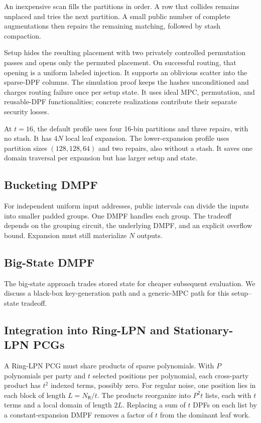 An inexpensive scan fills the partitions in order.
A row that collides remains unplaced and tries the next partition.
A small public number of complete augmentations then repairs the remaining
matching, followed by stash compaction.

Setup hides the resulting placement with two privately controlled permutation
passes and opens only the permuted placement.
On successful routing, that opening is a uniform labeled injection.
It supports an oblivious scatter into the sparse-DPF columns.
The simulation proof keeps the hashes unconditioned and charges routing
failure once per setup state.
It uses ideal MPC, permutation, and reusable-DPF functionalities;
concrete realizations contribute their separate security losses.

At $t=16$, the default profile uses four 16-bin partitions and three repairs,
with no stash. It has $4N$ local leaf expansion.
The lower-expansion profile uses partition sizes $(128,128,64)$ and two
repairs, also without a stash. It saves one domain traversal per expansion
but has larger setup and state.

\subsection{Bucketing DMPF}

For independent uniform input addresses, public intervals can divide the
inputs into smaller padded groups. One DMPF handles each group.
The tradeoff depends on the grouping circuit, the underlying DMPF, and an
explicit overflow bound. Expansion must still materialize $N$ outputs.

\subsection{Big-State DMPF}

The big-state approach \cite{dmpf} trades stored state for cheaper subsequent
evaluation. We discuss a black-box key-generation path and a generic-MPC
path for this setup--state tradeoff.

\subsection{Integration into Ring-LPN and Stationary-LPN PCGs}

A Ring-LPN PCG must share products of sparse polynomials.
With $P$ polynomials per party and $t$ selected positions per polynomial,
each cross-party product has $t^2$ indexed terms, possibly zero.
For regular noise, one position lies in each block of length
$L=N_{\mathsf R}/t$.
The products reorganize into $P^2t$ lists, each with $t$ terms and a
local domain of length $2L$.
Replacing a sum of $t$ DPFs on each list by a constant-expansion DMPF removes
a factor of $t$ from the dominant leaf work.

